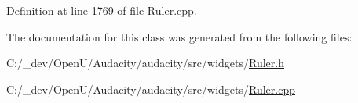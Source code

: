 Definition at line 1769 of file Ruler.\+cpp.



The documentation for this class was generated from the following files\+:\begin{DoxyCompactItemize}
\item 
C\+:/\+\_\+dev/\+Open\+U/\+Audacity/audacity/src/widgets/\hyperlink{_ruler_8h}{Ruler.\+h}\item 
C\+:/\+\_\+dev/\+Open\+U/\+Audacity/audacity/src/widgets/\hyperlink{_ruler_8cpp}{Ruler.\+cpp}\end{DoxyCompactItemize}
